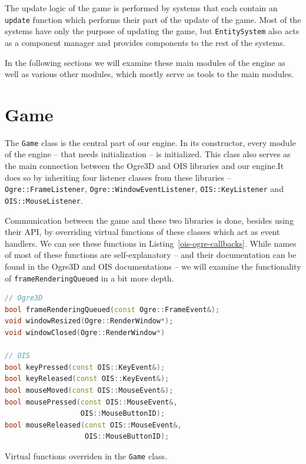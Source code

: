 The update logic of the game is performed by systems that each contain an \texttt{update} function which performs their part of the
update of the game. Most of the systems have only the purpose of updating the game, but \texttt{EntitySystem} also acts as a component
manager and provides components to the rest of the systems.

In the following sections we will examine these main modules of the engine as well as various other modules, which mostly serve as tools
to the main modules.

\section{Game}

The \texttt{Game} class is the central part of our engine. In its constructor, every module of the engine -- that needs initialization --
is initialized. This class also serves as the main connection between the Ogre3D and OIS libraries and our engine.It does so by inheriting
four listener classes from these libraries -- \texttt{Ogre::FrameListener}, \texttt{Ogre::WindowEventListener}, \texttt{OIS::KeyListener}
and \texttt{OIS::MouseListener}.

Communication between the game and these two libraries is done, besides using their API, by overriding virtual functions of these classes
which act as event handlers. We can see these functions in Listing~\ref{ois-ogre-callbacks}. While names of most of these functions are
self-explanatory -- and their documentation can be found in the Ogre3D and OIS documentations -- we will examine the functionality of
\texttt{frameRenderingQueued} in a bit more depth.

\begin{listing}[H]
    \centering
    \begin{lstlisting}[language=C++]
// Ogre3D
bool frameRenderingQueued(const Ogre::FrameEvent&);
void windowResized(Ogre::RenderWindow*);
void windowClosed(Ogre::RenderWindow*)

// OIS
bool keyPressed(const OIS::KeyEvent&);
bool keyReleased(const OIS::KeyEvent&);
bool mouseMoved(const OIS::MouseEvent&);
bool mousePressed(const OIS::MouseEvent&,
                  OIS::MouseButtonID);
bool mouseReleased(const OIS::MouseEvent&,
                   OIS::MouseButtonID);
    \end{lstlisting}
    \caption{Virtual functions overriden in the \texttt{Game} class.}
    \label{ois-ogre-callbacks}
\end{listing}

